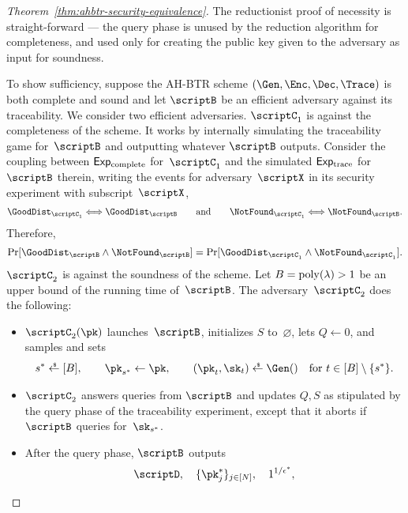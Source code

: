 \begin{proof}
[%
Theorem~\ref{thm:ahbtr-security-equivalence}]
The reductionist proof of necessity is straight-forward ---
the query phase is
unused by the reduction algorithm for completeness, and
used only for creating the public key given to the adversary as input
for soundness.

To show sufficiency, suppose the AH-BTR scheme $(\Gen,\Enc,\Dec,\Trace)$ is both complete and sound and let $\scriptB$ be an efficient adversary against its traceability.
We consider two efficient adversaries.
$\scriptC_1$ is against the completeness of the scheme.
It works by internally simulating the traceability game for~$\scriptB$ and outputting whatever $\scriptB$ outputs.
Consider the coupling between $\ExpComplete$ for~$\scriptC_1$
and the simulated $\ExpTrace$ for~$\scriptB$ therein,
writing the events for adversary~$\scriptX$ in its security experiment with subscript~$\scriptX$,
\begin{align*}
\GoodDist_{\scriptC_1}
\Longleftrightarrow
\GoodDist_\scriptB
\qquad\textup{and}\qquad
\NotFound_{\scriptC_1}
\Longleftrightarrow
\NotFound_\scriptB.
\end{align*}
Therefore,
\begin{align*}
\Pr[\GoodDist_\scriptB\wedge\NotFound_\scriptB]
=
\Pr[\GoodDist_{\scriptC_1}\wedge\NotFound_{\scriptC_1}].
\end{align*}
$\scriptC_2$ is against the soundness of the scheme.
Let ${B=\operatorname{poly}(\lambda)>1}$ be an upper bound of the running time of~$\scriptB$.
The adversary~$\scriptC_2$ does the following:
\begin{itemize}
\item $\scriptC_2(\pk)$ launches~$\scriptB$,
initializes $S$ to~$\varnothing$,
lets ${Q\gets 0}$, and
samples and sets
\begin{align*}
s^\ast\draws[B],\qquad
\pk_{s^\ast}\gets\pk,\qquad
(\pk_t,\sk_t)\draws\Gen()\quad\textup{for }t\in{[B]\setminus{\{s^\ast\}}}.
\end{align*}
\item $\scriptC_2$ answers queries from $\scriptB$ and updates $Q,S$ as stipulated by the query phase of the traceability experiment, except that it aborts if $\scriptB$ queries for~$\sk_{s^\ast}$.
\item After the query phase, $\scriptB$ outputs
\begin{align*}
\scriptD,\quad
\{\pk_j^\ast\}_{j\in[N]},\quad
1^{1/\epsilon^\ast},
\end{align*}

\end{itemize}
\end{proof}
